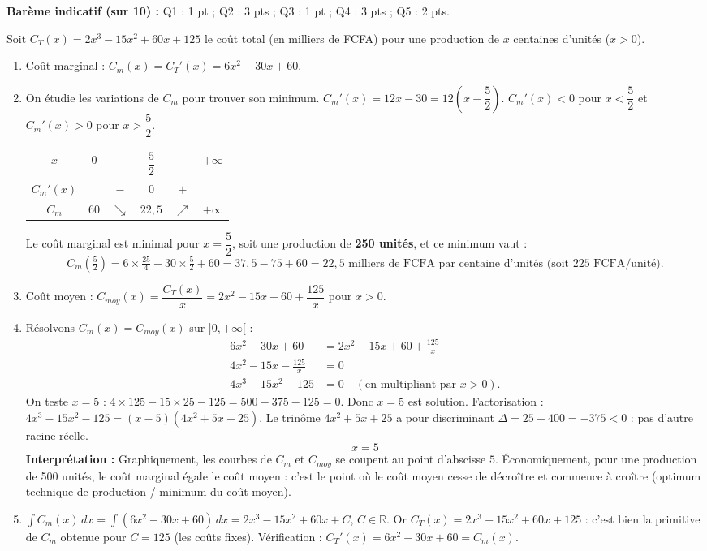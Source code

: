 \documentclass[11pt]{article}
\begin{document}
\begin{corrige}
\textbf{Barème indicatif (sur 10) :} Q1 : 1 pt ; Q2 : 3 pts ; Q3 : 1 pt ; Q4 : 3 pts ; Q5 : 2 pts.

Soit $C_T(x)=2x^3-15x^2+60x+125$ le coût total (en milliers de FCFA) pour une production de $x$ centaines d'unités ($x>0$).
\begin{enumerate}
    \item Coût marginal : $C_m(x)=C_T'(x)=6x^2-30x+60$.
    \item On étudie les variations de $C_m$ pour trouver son minimum.
    $C_m'(x)=12x-30=12\left(x-\dfrac52\right)$.
    $C_m'(x)<0$ pour $x<\dfrac52$ et $C_m'(x)>0$ pour $x>\dfrac52$.
    \begin{center}
    \begin{tabular}{|c|ccccc|}\hline
    $x$ & $0$ & & $\dfrac52$ & & $+\infty$ \\ \hline
    $C_m'(x)$ & & $-$ & $0$ & $+$ & \\ \hline
    $C_m$ & $60$ & $\searrow$ & $22{,}5$ & $\nearrow$ & $+\infty$ \\ \hline
    \end{tabular}
    \end{center}
    Le coût marginal est minimal pour $x=\dfrac52$, soit une production de \textbf{250 unités}, et ce minimum vaut :
    \[ C_m\!\left(\tfrac52\right)=6\times\tfrac{25}{4}-30\times\tfrac52+60=37{,}5-75+60=22{,}5 \text{ milliers de FCFA par centaine d'unités (soit 225 FCFA/unité)}. \]
    \item Coût moyen : $C_{moy}(x)=\dfrac{C_T(x)}{x}=2x^2-15x+60+\dfrac{125}{x}$ pour $x>0$.
    \item Résolvons $C_m(x)=C_{moy}(x)$ sur $]0,+\infty[$ :
    \begin{align*}
    6x^2-30x+60&=2x^2-15x+60+\frac{125}{x}\\
    4x^2-15x-\frac{125}{x}&=0\\
    4x^3-15x^2-125&=0 \quad (\text{en multipliant par } x>0).
    \end{align*}
    On teste $x=5$ : $4\times125-15\times25-125=500-375-125=0$. Donc $x=5$ est solution.
    Factorisation : $4x^3-15x^2-125=(x-5)(4x^2+5x+25)$. Le trinôme $4x^2+5x+25$ a pour discriminant $\Delta=25-400=-375<0$ : pas d'autre racine réelle.
    \[ \boxed{x=5} \]
    \textbf{Interprétation :} Graphiquement, les courbes de $C_m$ et $C_{moy}$ se coupent au point d'abscisse $5$. Économiquement, pour une production de 500 unités, le coût marginal égale le coût moyen : c'est le point où le coût moyen cesse de décroître et commence à croître (optimum technique de production / minimum du coût moyen).
    \item $\displaystyle\int C_m(x)\,dx=\int(6x^2-30x+60)\,dx=2x^3-15x^2+60x+C$, $C\in\mathbb{R}$.
    Or $C_T(x)=2x^3-15x^2+60x+125$ : c'est bien la primitive de $C_m$ obtenue pour $C=125$ (les coûts fixes). Vérification : $C_T'(x)=6x^2-30x+60=C_m(x)$.
\end{enumerate}


\end{corrige}
\end{document}
